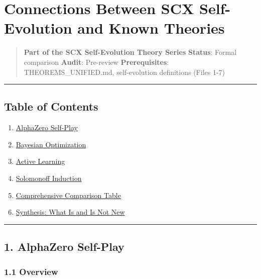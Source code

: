 \documentclass[
  12pt,
]{ctexart}
\author{SCX}
\date{2026}
\providecommand{\tightlist}{%
  \setlength{\itemsep}{0pt}\setlength{\parskip}{0pt}}
\begin{document}
\section{Connections Between SCX Self-Evolution and Known
Theories}\label{connections-between-scx-self-evolution-and-known-theories}

\begin{quote}
\textbf{Part of the SCX Self-Evolution Theory Series} \textbf{Status}:
Formal comparison \textbar{} \textbf{Audit}: Pre-review
\textbf{Prerequisites}: THEOREMS\_UNIFIED.md, self-evolution definitions
(Files 1-7)
\end{quote}

\begin{center}\rule{0.5\linewidth}{0.5pt}\end{center}

\subsection{Table of Contents}\label{table-of-contents}

\begin{enumerate}
\def\labelenumi{\arabic{enumi}.}
\tightlist
\item
  \hyperref[1-alphazero-self-play]{AlphaZero Self-Play}
\item
  \hyperref[2-bayesian-optimization]{Bayesian Optimization}
\item
  \hyperref[3-active-learning]{Active Learning}
\item
  \hyperref[4-solomonoff-induction]{Solomonoff Induction}
\item
  \hyperref[5-comprehensive-comparison-table]{Comprehensive Comparison
  Table}
\item
  \hyperref[6-synthesis-what-is-and-is-not-new]{Synthesis: What Is and
  Is Not New}
\end{enumerate}

\begin{center}\rule{0.5\linewidth}{0.5pt}\end{center}

\subsection{1. AlphaZero Self-Play}\label{alphazero-self-play}

\subsubsection{1.1 Overview}\label{overview}
\end{document}
